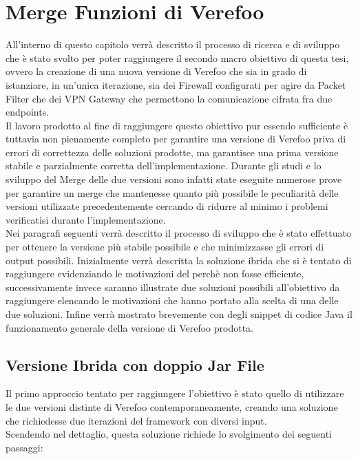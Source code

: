 


\chapter{Merge Funzioni di Verefoo} \label{ch:MergeChapter}

All'interno di questo capitolo verrà descritto il processo di ricerca e di sviluppo che è stato svolto per poter raggiungere il secondo macro obiettivo di questa tesi, ovvero 
la creazione di una nuova versione di Verefoo che sia in grado di istanziare, in un'unica iterazione, sia dei Firewall configurati per agire da Packet Filter che dei VPN Gateway 
che permettono la comunicazione cifrata fra due endpoints.\\
Il lavoro prodotto al fine di raggiungere questo obiettivo pur essendo sufficiente è tuttavia non pienamente completo per garantire una versione di Verefoo priva di errori di correttezza delle soluzioni prodotte,
ma garantisce una prima versione stabile e parzialmente corretta dell'implementazione. Durante gli studi e lo sviluppo del Merge delle due versioni sono infatti state eseguite numerose prove 
per garantire un merge che mantenesse quanto più possibile le peculiarità delle versioni utilizzate precedentemente cercando di ridurre al minimo i problemi verificatisi durante l'implementazione.\\
Nei paragrafi seguenti verrà descritto il processo di sviluppo che è stato effettuato per ottenere la versione più stabile possibile e che minimizzasse gli errori di output possibili. Inizialmente 
verrà descritta la soluzione ibrida che si è tentato di raggiungere evidenziando le motivazioni del perchè non fosse efficiente, successivamente invece saranno illustrate due soluzioni possibili all'obiettivo
da raggiungere elencando le motivazioni che hanno portato alla scelta di una delle due soluzioni. Infine verrà mostrato brevemente con degli snippet di codice Java il funzionamento generale della versione di 
Verefoo prodotta. 

\newpage

\section{Versione Ibrida con doppio Jar File}
Il primo approccio tentato per raggiungere l'obiettivo è stato quello di utilizzare le due versioni distinte di Verefoo contemporaneamente, creando una soluzione che richiedesse due iterazioni del framework con diversi input.\\
Scendendo nel dettaglio, questa soluzione richiede lo svolgimento dei seguenti passaggi:

